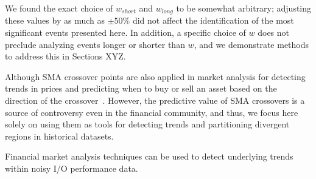 
We found the exact choice of $w_{short}$ and $w_{long}$ to be somewhat arbitrary; adjusting these values by as much as $\pm 50\%$ did not affect the identification of the most significant events presented here.
In addition, a specific choice of $w$ does not preclude analyzing events longer or shorter than $w$, and we demonstrate methods to address this in Sections XYZ.

Although SMA crossover points are also applied in market analysis for detecting trends in prices and predicting when to buy or sell an asset based on the direction of the crossover~\cite{brock1992simple}.
However, the predictive value of SMA crossovers is a source of controversy even in the financial community, and thus, we focus here solely on using them as tools for detecting trends and partitioning divergent regions in historical datasets.

Financial market analysis techniques can be used to detect underlying trends within noisy I/O performance data.

